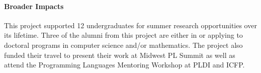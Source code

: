 \paragraph{Broader Impacts}
This project supported 12 undergraduates for summer research opportunities over its lifetime.
Three of the alumni from this project are either in or applying to doctoral programs in computer science and/or mathematics.
The project also funded their travel to present their work at Midwest PL Summit as well as attend the Programming Languages Mentoring Workshop at PLDI and ICFP.
